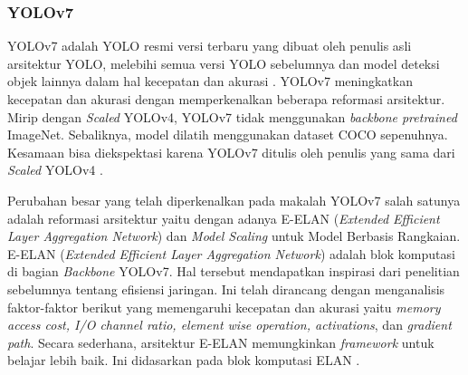 \subsubsection{YOLOv7}
\label{subsec:yolov7}

\par YOLOv7 adalah YOLO resmi versi terbaru yang dibuat oleh penulis asli arsitektur YOLO, melebihi semua versi YOLO sebelumnya dan model deteksi objek lainnya dalam hal kecepatan dan akurasi \cite{wang2022yolov7}. YOLOv7 meningkatkan kecepatan dan akurasi dengan memperkenalkan beberapa reformasi arsitektur. Mirip dengan \textit{Scaled} YOLOv4, YOLOv7 tidak menggunakan \textit{backbone pretrained} ImageNet. Sebaliknya, model dilatih menggunakan dataset COCO sepenuhnya. Kesamaan bisa diekspektasi karena YOLOv7 ditulis oleh penulis yang sama dari \textit{Scaled} YOLOv4 \cite{yolov7explain}.

Perubahan besar yang telah diperkenalkan pada makalah YOLOv7 salah satunya adalah reformasi arsitektur yaitu dengan adanya E-ELAN (\textit{Extended Efficient Layer Aggregation Network}) dan \textit{Model Scaling} untuk Model Berbasis Rangkaian. E-ELAN (\textit{Extended Efficient Layer Aggregation Network}) adalah blok komputasi di bagian \textit{Backbone} YOLOv7. Hal tersebut mendapatkan inspirasi dari penelitian sebelumnya tentang efisiensi jaringan. Ini telah dirancang dengan menganalisis faktor-faktor berikut yang memengaruhi kecepatan dan akurasi yaitu \textit{memory access cost, I/O channel ratio, element wise operation, activations}, dan \textit{gradient path}. Secara sederhana, arsitektur E-ELAN memungkinkan \textit{framework} untuk belajar lebih baik. Ini didasarkan pada blok komputasi ELAN \cite{yolov7explain}.